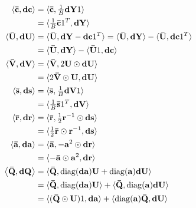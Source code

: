 \begin{align}
\langle \gradobj{c} , \obj{dc} \rangle
& = \langle \gradobj{c} , \tfrac{1}{B} \obj{dY} 1 \rangle \\
& = \langle \tfrac{1}{B} \gradobj{c} 1^{T} , \obj{dY} \rangle \\
\langle \gradobj{U}, \obj{dU} \rangle
& = \langle \gradobj{U}, \obj{dY} - \obj{dc} 1^{T} \rangle = \langle \gradobj{U}, \obj{dY} \rangle - \langle \gradobj{U}, \obj{dc} 1^{T} \rangle \\
& = \langle \gradobj{U}, \obj{dY} \rangle - \langle \gradobj{U} 1, \obj{dc} \rangle \\
\langle \gradobj{V}, \obj{dV} \rangle
& = \langle \gradobj{V}, 2 \obj{U} \odot \obj{dU} \rangle \\
& = \langle 2 \gradobj{V} \odot \obj{U}, \obj{dU} \rangle \\
\langle \gradobj{s}, \obj{ds} \rangle
& = \langle \gradobj{s}, \tfrac{1}{B} \obj{dV} 1 \rangle \\
& = \langle \tfrac{1}{B} \gradobj{s} 1^{T}, \obj{dV} \rangle \\
\langle \gradobj{r}, \obj{dr} \rangle
& = \langle \gradobj{r}, \tfrac{1}{2} \obj{r}^{-1} \odot \obj{ds} \rangle \\
& = \langle \tfrac{1}{2} \gradobj{r} \odot \obj{r}^{-1}, \obj{ds} \rangle \\
\langle \gradobj{a}, \obj{da} \rangle
& = \langle \gradobj{a}, - \obj{a}^{2} \odot \obj{dr} \rangle \\
& = \langle - \gradobj{a} \odot \obj{a}^{2}, \obj{dr} \rangle \\
\left\langle \gradobj{Q}, \obj{dQ} \right\rangle
& = \langle \gradobj{Q}, \diag(\obj{da}) \obj{U} + \diag(\obj{a}) \obj{dU} \rangle \\
& = \langle \gradobj{Q}, \diag(\obj{da}) \obj{U} \rangle + \langle \gradobj{Q}, \diag(\obj{a}) \obj{dU} \rangle \\
& = \langle (\gradobj{Q} \odot \obj{U}) 1, \obj{da} \rangle + \langle \diag(\obj{a}) \gradobj{Q}, \obj{dU} \rangle
\end{align}

